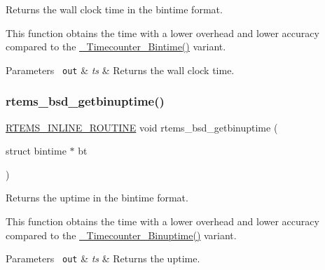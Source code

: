Returns the wall clock time in the bintime format. 

This function obtains the time with a lower overhead and lower accuracy compared to the \mbox{\hyperlink{group__RTEMSScoreTimecounter_ga988aedc781dc73e89a481adb99455d21}{\+\_\+\+Timecounter\+\_\+\+Bintime()}} variant.


\begin{DoxyParams}[1]{Parameters}
\mbox{\texttt{ out}}  & {\em ts} & Returns the wall clock time. \\
\hline
\end{DoxyParams}
\mbox{\label{group__RTEMSAPIBSD_gad5d1a9f6ecb7cc442d8350e92dcd9cdc}} 
\subsubsection{\texorpdfstring{rtems\_bsd\_getbinuptime()}{rtems\_bsd\_getbinuptime()}}
{\footnotesize\ttfamily \mbox{\hyperlink{group__RTEMSScoreBaseDefs_gac216239df231d5dbd15e3520b0b9313f}{R\+T\+E\+M\+S\+\_\+\+I\+N\+L\+I\+N\+E\+\_\+\+R\+O\+U\+T\+I\+NE}} void rtems\+\_\+bsd\+\_\+getbinuptime (\begin{DoxyParamCaption}\item[{struct bintime $\ast$}]{bt }\end{DoxyParamCaption})}



Returns the uptime in the bintime format. 

This function obtains the time with a lower overhead and lower accuracy compared to the \mbox{\hyperlink{group__RTEMSScoreTimecounter_ga8c656c32ac30398dedcec9f43163bee4}{\+\_\+\+Timecounter\+\_\+\+Binuptime()}} variant.


\begin{DoxyParams}[1]{Parameters}
\mbox{\texttt{ out}}  & {\em ts} & Returns the uptime. \\
\hline
\end{DoxyParams}
\mbox{\label{group__RTEMSAPIBSD_gaec9940c84580187d5e9792661d5e595b}} 
